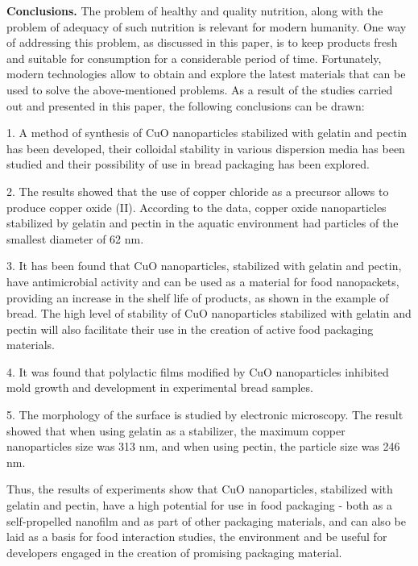 \begin{multicols}{2}
{\bfseries Conclusions.} The problem of healthy and quality nutrition,
along with the problem of adequacy of such nutrition is relevant for
modern humanity. One way of addressing this problem, as discussed in
this paper, is to keep products fresh and suitable for consumption for a
considerable period of time. Fortunately, modern technologies allow to
obtain and explore the latest materials that can be used to solve the
above-mentioned problems. As a result of the studies carried out and
presented in this paper, the following conclusions can be drawn:

1. A method of synthesis of CuO nanoparticles stabilized with gelatin
and pectin has been developed, their colloidal stability in various
dispersion media has been studied and their possibility of use in bread
packaging has been explored.

2. The results showed that the use of copper chloride as a precursor
allows to produce copper oxide (II). According to the data, copper oxide
nanoparticles stabilized by gelatin and pectin in the aquatic
environment had particles of the smallest diameter of 62 nm.

3. It has been found that CuO nanoparticles, stabilized with gelatin and
pectin, have antimicrobial activity and can be used as a material for
food nanopackets, providing an increase in the shelf life of products,
as shown in the example of bread. The high level of stability of CuO
nanoparticles stabilized with gelatin and pectin will also facilitate
their use in the creation of active food packaging materials.

4. It was found that polylactic films modified by CuO nanoparticles
inhibited mold growth and development in experimental bread samples.

5. The morphology of the surface is studied by electronic microscopy.
The result showed that when using gelatin as a stabilizer, the maximum
copper nanoparticles size was 313 nm, and when using pectin, the
particle size was 246 nm.

Thus, the results of experiments show that CuO nanoparticles, stabilized
with gelatin and pectin, have a high potential for use in food packaging
- both as a self-propelled nanofilm and as part of other packaging
materials, and can also be laid as a basis for food interaction studies,
the environment and be useful for developers engaged in the creation of
promising packaging material.
\end{multicols}

